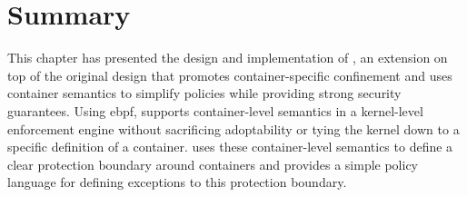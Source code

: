 

\section{Summary}%
\label{s:bpfcontain-summary}

This chapter has presented the design and implementation of \bpfcontain{}, an extension on
top of the original \bpfbox{} design that promotes container-specific confinement and uses
container semantics to simplify policies while providing strong security guarantees.
Using \gls{ebpf}, \bpfcontain{} supports container-level semantics in a kernel-level
enforcement engine without sacrificing adoptability or tying the kernel down to a specific
definition of a container. \bpfcontain{} uses these container-level semantics to define
a clear protection boundary around containers and provides a simple policy language for
defining exceptions to this protection boundary.
